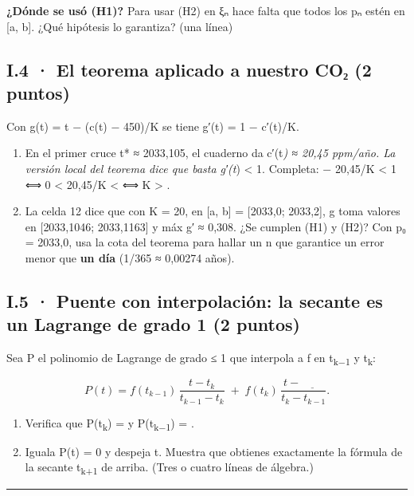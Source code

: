 \textbf{¿Dónde se usó (H1)?} Para usar (H2) en ξₙ hace falta que todos los pₙ estén en {[}a, b{]}. ¿Qué hipótesis lo garantiza? (una línea)

\subsection{I.4 · El teorema aplicado a nuestro CO₂ (2 puntos)}

Con g(t) = t − (c(t) − 450)/K se tiene g′(t) = 1 − c′(t)/K.

\begin{enumerate}
\def\labelenumi{(\alph{enumi})}
\item
  En el primer cruce t* ≈ 2033,105, el cuaderno da c′(t\emph{) ≈ 20,45 ppm/año. La versión local del teorema dice que basta \textbar g′(t})\textbar{} \textless{} 1. Completa:  − 20,45/K\textbar{} \textless{} 1 ⟺ 0 \textless{} 20,45/K \textless{}  ⟺ K \textgreater{} .
\item
  La celda 12 dice que con K = 20, en {[}a, b{]} = {[}2033,0; 2033,2{]}, g toma valores en {[}2033,1046; 2033,1163{]} y máx \textbar g′\textbar{} ≈ 0,308. ¿Se cumplen (H1) y (H2)? Con p₀ = 2033,0, usa la cota del teorema para hallar un n que garantice un error menor que \textbf{un día} (1/365 ≈ 0,00274 años).
\end{enumerate}

\subsection{I.5 · Puente con interpolación: la secante es un Lagrange de grado 1 (2 puntos)}

Sea P el polinomio de Lagrange de grado ≤ 1 que interpola a f en t\textsubscript{k−1} y t\textsubscript{k}:

\[P(t) = f(t_{k-1})\,\frac{t - t_k}{t_{k-1} - t_k} \;+\; f(t_k)\,\frac{t - \underline{\qquad}}{t_k - t_{k-1}}.\]

\begin{enumerate}
\def\labelenumi{(\alph{enumi})}
\item
  Verifica que P(t\textsubscript{k}) =  y P(t\textsubscript{k−1}) = .
\item
  Iguala P(t) = 0 y despeja t. Muestra que obtienes exactamente la fórmula de la secante t\textsubscript{k+1} de arriba. (Tres o cuatro líneas de álgebra.)
\end{enumerate}

\begin{center}\rule{0.5\linewidth}{0.5pt}\end{center}

